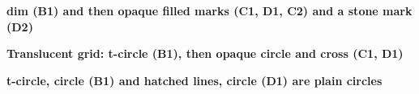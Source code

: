 \documentclass{article}
\newcommand\case[1]{\par\medskip\noindent\textbf{#1}\par\nopagebreak}
\begin{document}

\case{dim (B1) and then opaque filled marks (C1, D1, C2) and a stone mark (D2)}
\begin{goban}[5x2]
\end{goban}

\case{Translucent grid: t-circle (B1), then opaque circle and cross (C1, D1)}
\begin{goban}[5x1, grid = {line = {opacity = 0.3}}]
\end{goban}

\case{t-circle, circle (B1) and hatched lines, circle (D1) are plain circles}
\begin{goban}[5x1]
\end{goban}
\end{document}
